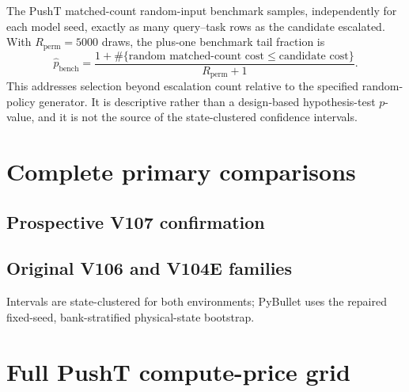 \documentclass[10pt]{article}
\theoremstyle{definition}
\theoremstyle{remark}
\newcommand{\pusht}{PushT}
\begin{document}
The \pusht{} matched-count random-input benchmark samples, independently for
each model seed, exactly as many query--task rows as the candidate escalated.  With
$R_{\mathrm{perm}}=5000$ draws, the plus-one benchmark tail fraction is
\[
 \widehat p_{\mathrm{bench}}=
 \frac{1+
 \#\{\text{random matched-count cost}\leq\text{candidate cost}\}}
 {R_{\mathrm{perm}}+1}.
\]
This addresses selection beyond escalation count relative to the specified
random-policy generator.  It is descriptive rather than a design-based
hypothesis-test $p$-value, and it is not the source of the state-clustered
confidence intervals.

\section{Complete primary comparisons}

\subsection{Prospective V107 confirmation}
\begin{center}
  \small
  \resizebox{0.92\linewidth}{!}{}
\end{center}

\subsection{Original V106 and V104E families}
\noindent Intervals are state-clustered for both environments; PyBullet uses the
repaired fixed-seed, bank-stratified physical-state bootstrap.
\begin{center}
  \small
  \resizebox{\linewidth}{!}{}
\end{center}


\section{Full PushT compute-price grid}
\begin{table}[ht]
\centering
\caption{PushT router-minus-reference decision cost across the full declared
compute-price grid.  The primary frozen point is $\lambda=0.002$; positive
values at larger prices delimit rather than invalidate that operating-point
result.}
\label{tab:lambda}
\small
\resizebox{\linewidth}{!}{}
\end{table}
\end{document}
